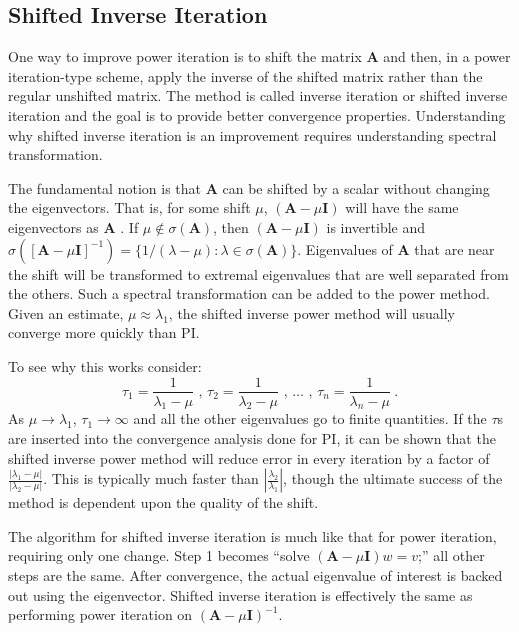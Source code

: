 \documentclass[12pt]{article}
\newcommand{\ve}[1]{\ensuremath{\mathbf{#1}}}
\begin{document}
\subsection*{Shifted Inverse Iteration}
One way to improve power iteration is to shift the matrix $\ve{A}$ and then, in a power iteration-type scheme, apply the inverse of the shifted matrix rather than the regular unshifted matrix. The method is called inverse iteration or shifted inverse iteration and the goal is to provide better convergence properties. Understanding why shifted inverse iteration is an improvement requires understanding spectral transformation. 

The fundamental notion is that $\ve{A}$ can be shifted by a scalar without changing the eigenvectors. That is, for some shift $\mu$, $(\ve{A} - \mu \ve{I})$ will have the same eigenvectors as $\ve{A}$ \cite{Sorensen1996}. If $\mu \notin \sigma(\ve{A})$, then $(\ve{A} - \mu \ve{I})$ is invertible and $\sigma([\ve{A} - \mu \ve{I}]^{-1}) = \{1/(\lambda - \mu):\lambda \in \sigma(\ve{A})\}$. Eigenvalues of $\ve{A}$ that are near the shift will be transformed to extremal eigenvalues that are well separated from the others. Such a spectral transformation can be added to the power method. Given an estimate, $\mu \approx \lambda_1$, the shifted inverse power method will usually converge more quickly than PI.

To see why this works consider: 
%
\begin{equation}
    \tau_1 = \frac{1}{\lambda_1 - \mu}\text{ , }\tau_2 = \frac{1}{\lambda_2 - \mu}\text{ , }\dots\text{ , }\tau_n = \frac{1}{\lambda_n - \mu} \:.
\end{equation}
%
As $\mu \to \lambda_1$, $\tau_1 \to \infty$ and all the other eigenvalues go to finite quantities. If the $\tau$s are inserted into the convergence analysis done for PI, it can be shown that the shifted inverse power method will reduce error in every iteration by a factor of $\frac{|\lambda_{1} - \mu|}{|\lambda_{2} - \mu|}$. This is typically much faster than $|\frac{\lambda_{2}}{\lambda_{1}}|$, though the ultimate success of the method is dependent upon the quality of the shift.%

The algorithm for shifted inverse iteration is much like that for power iteration, requiring only one change. Step 1 becomes ``solve $(\ve{A}-\mu \ve{I})w = v$;'' all other steps are the same. After convergence, the actual eigenvalue of interest is backed out using the eigenvector. %
Shifted inverse iteration is effectively the same as performing power iteration on $(\ve{A}-\mu \ve{I})^{-1}$. 
\end{document}
